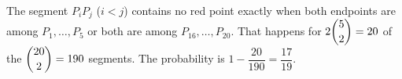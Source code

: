 The segment $P_iP_j$ ($i<j$) contains no red point exactly when both endpoints are among $P_1,\dots,P_5$ or both are among $P_{16},\dots,P_{20}$. That happens for $2\dbinom52=20$ of the $\dbinom{20}2=190$ segments. The probability is $1-\dfrac{20}{190}=\boxed{\dfrac{17}{19}}$.
